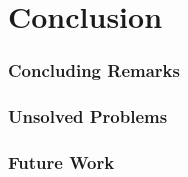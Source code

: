 \chapter{Conclusion} \label{chp:conclusion}
\subsection{Concluding Remarks} \label{sec:conclusion/remarks}

\subsection{Unsolved Problems} \label{sec:conclusion/unsolved}

\subsection{Future Work} \label{sec:conclusion/future-work}